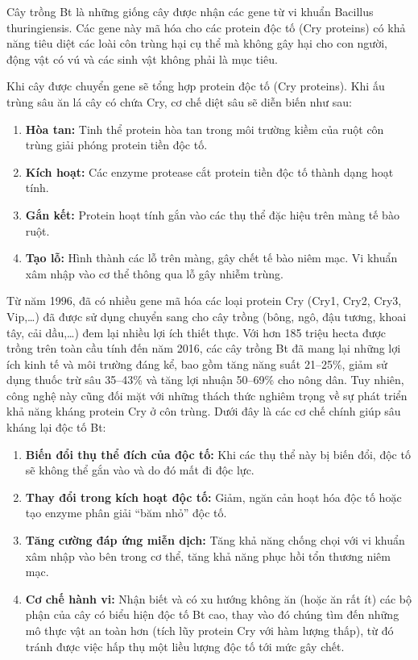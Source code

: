 \documentclass[12pt,a4paper,twoside]{article}
\newenvironment{readingpassage}[1][]{%
    \begin{tcolorbox}[enhanced, colback=grayLight, colframe=secondaryBlue,
        coltitle=textDark, fonttitle=\bfseries, title={#1},
        rounded corners, arc=3mm, boxrule=1pt,
        left=15pt, right=15pt, top=10pt, bottom=10pt,
        breakable, before skip=10pt, after skip=10pt, drop fuzzy shadow]
    \setstretch{1.3}
}{\end{tcolorbox}}
\begin{document}
\begin{readingpassage}[]

Cây trồng Bt là những giống cây được nhận các gene từ vi khuẩn Bacillus thuringiensis. Các gene này mã hóa cho các protein độc tố (Cry proteins) có khả năng tiêu diệt các loài côn trùng hại cụ thể mà không gây hại cho con người, động vật có vú và các sinh vật không phải là mục tiêu.

Khi cây được chuyển gene sẽ tổng hợp protein độc tố (Cry proteins). Khi ấu trùng sâu ăn lá cây có chứa Cry, cơ chế diệt sâu sẽ diễn biến như sau:

\begin{enumerate}[leftmargin=2em, itemsep=3pt, topsep=2pt]
\item \textbf{Hòa tan:} Tinh thể protein hòa tan trong môi trường kiềm của ruột côn trùng giải phóng protein tiền độc tố.
\item \textbf{Kích hoạt:} Các enzyme protease cắt protein tiền độc tố thành dạng hoạt tính.
\item \textbf{Gắn kết:} Protein hoạt tính gắn vào các thụ thể đặc hiệu trên màng tế bào ruột.
\item \textbf{Tạo lỗ:} Hình thành các lỗ trên màng, gây chết tế bào niêm mạc. Vi khuẩn xâm nhập vào cơ thể thông qua lỗ gây nhiễm trùng.
\end{enumerate}

Từ năm 1996, đã có nhiều gene mã hóa các loại protein Cry (Cry1, Cry2, Cry3, Vip,\ldots) đã được sử dụng chuyển sang cho cây trồng (bông, ngô, đậu tương, khoai tây, cải dầu,\ldots) đem lại nhiều lợi ích thiết thực. Với hơn 185 triệu hecta được trồng trên toàn cầu tính đến năm 2016, các cây trồng Bt đã mang lại những lợi ích kinh tế và môi trường đáng kể, bao gồm tăng năng suất 21--25\%, giảm sử dụng thuốc trừ sâu 35--43\% và tăng lợi nhuận 50--69\% cho nông dân. Tuy nhiên, công nghệ này cũng đối mặt với những thách thức nghiêm trọng về sự phát triển khả năng kháng protein Cry ở côn trùng. Dưới đây là các cơ chế chính giúp sâu kháng lại độc tố Bt:

\begin{enumerate}[leftmargin=2em, itemsep=3pt, topsep=2pt]
\item \textbf{Biến đổi thụ thể đích của độc tố:} Khi các thụ thể này bị biến đổi, độc tố sẽ không thể gắn vào và do đó mất đi độc lực.
\item \textbf{Thay đổi trong kích hoạt độc tố:} Giảm, ngăn cản hoạt hóa độc tố hoặc tạo enzyme phân giải ``băm nhỏ'' độc tố.
\item \textbf{Tăng cường đáp ứng miễn dịch:} Tăng khả năng chống chọi với vi khuẩn xâm nhập vào bên trong cơ thể, tăng khả năng phục hồi tổn thương niêm mạc.
\item \textbf{Cơ chế hành vi:} Nhận biết và có xu hướng không ăn (hoặc ăn rất ít) các bộ phận của cây có biểu hiện độc tố Bt cao, thay vào đó chúng tìm đến những mô thực vật an toàn hơn (tích lũy protein Cry với hàm lượng thấp), từ đó tránh được việc hấp thụ một liều lượng độc tố tới mức gây chết.
\end{enumerate}


\end{readingpassage}
\end{document}
